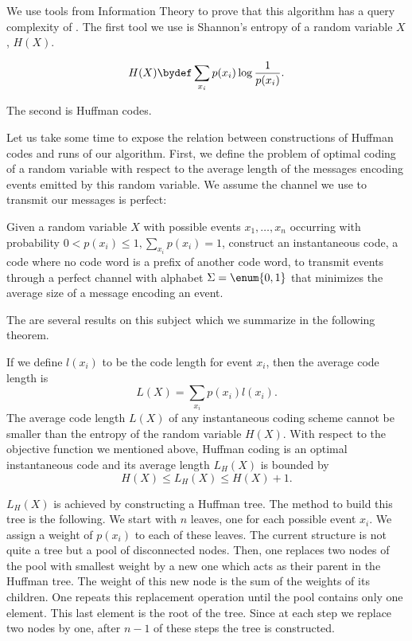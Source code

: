 We use tools from Information Theory to prove that this algorithm has
a query complexity of \BigO{\ITLB}. The first tool we use is Shannon's entropy of a random
variable \(X\), \(H(X)\).
\begin{definition}
\begin{displaymath}
H(X) \bydef \sum_{x_i} p(x_i) \log \frac{1}{p(x_i)}.
\end{displaymath}
\end{definition}
The second is Huffman codes.

Let us take some time to expose the relation between constructions of Huffman
codes and runs of our algorithm. First, we define the problem of optimal
coding of a random variable with respect to the average length of the messages
encoding events emitted by this random variable. We assume the channel we
use to transmit our messages is perfect:
\begin{problem}
Given a random variable \(X\) with possible events \(x_1,\ldots,x_n\) occurring
with probability \(0 < p(x_i) \le 1, \sum_{x_i} p(x_i) = 1\), construct an
instantaneous code, \ie a code where no code word is a prefix of another code
word, to transmit events through a perfect channel with alphabet
\(\Sigma = \enum{0,1}\) that minimizes the average size of a message encoding
an event.
\end{problem}

The are several results on this subject which we summarize in the
following theorem.
\begin{theorem}
If we define \(l(x_i)\) to be the code
length for event \(x_i\), then the average code length is
\begin{displaymath}
L(X) = \sum_{x_i} p(x_i) l(x_i).
\end{displaymath}
The average code length \(L(X)\) of any instantaneous coding scheme cannot be smaller than
the entropy of the random variable \(H(X)\).
With respect to the objective function we mentioned above, Huffman coding is
an optimal instantaneous code and its average length \(L_H(X)\) is bounded by
\begin{displaymath}
H(X) \le L_H(X) \le H(X) + 1.
\end{displaymath}
\end{theorem}

\(L_H(X)\) is achieved by constructing a Huffman tree. The method to build this
tree is the following. We start with \(n\) leaves, one for each possible event
\(x_i\). We assign a weight of \(p(x_i)\) to each of these leaves. The current
structure is not quite a tree but a pool of disconnected nodes. Then, one
replaces two nodes of the pool with smallest weight by a new one which
acts as their parent in the Huffman tree. The weight of this new node is
the sum of the weights of its children. One repeats this
replacement operation until the pool contains only one element. This last
element is the root of the tree. Since at each step we replace two nodes by
one, after \(n-1\) of these steps the tree is constructed.

